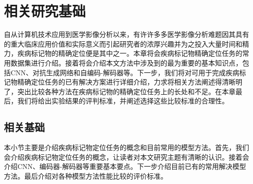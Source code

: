 \chapter{相关研究基础}

自从计算机技术应用到医学影像分析以来，有许许多多医学影像分析难题因其具有的重大临床应用价值和实际意义而引起研究者的浓厚兴趣并为之投入大量时间和精力，疾病标记物的精确定位便是其中之一。本章将会疾病标记物精确定位任务的常用数据集进行介绍。接着将会介绍本文方法中涉及到的最为重要的基本知识点，包括CNN、对抗生成网络和自编码-解码器等。下一步，我们将对可用于完成疾病标记物精确定位任务的已有解决方案进行详细介绍，力求将相关方法阐述得清晰明了，突出比较各种方法在疾病标记物的精确定位任务上的长处和不足。在本章最后，我们将给出实验结果的评判标准，并阐述选择这些比较标准的合理性。

\section{相关基础}
本小节主要是介绍疾病标记物定位任务的概念和目前常用的模型方法。首先，我们会介绍疾病标记物定位任务的概念，让读者对本文研究主题有清晰的认识。接着会介绍CNN、编码器-解码器等重要基本要点。下一步介绍目前已有的常用解决模型方法。最后介绍对各种模型方法性能比较的评价标准。

